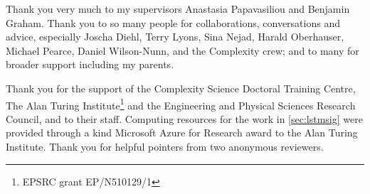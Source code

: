 \documentclass[11pt,a4paper]{report}      %
\begin{document}

\def \alph#1{{\color{bluee}\mathbf{#1}}}

\thesistitlecolourpage           %


\tableofcontents                     %
\listoftables                      %
\listoffigures                     %

\begin{thesisacknowledgments}        %

Thank you very much to my supervisors Anastasia Papavasiliou and Benjamin Graham. Thank you to so many people for collaborations, conversations and advice, especially  Joscha Diehl, 
Terry Lyons, %
Sina Nejad, Harald Oberhauser, Michael Pearce, Daniel Wilson-Nunn, and the Complexity crew; and to many for broader support including my parents.

Thank you for the support of the Complexity Science Doctoral Training Centre, The Alan Turing Institute\footnote{EPSRC grant EP/N510129/1} and the Engineering and Physical Sciences Research Council, and to their staff.
Computing resources for the work in \autoref{sec:lstmsig} were provided through a kind Microsoft Azure for Research award to the Alan Turing Institute.
Thank you for helpful pointers from two anonymous reviewers.
\end{thesisacknowledgments}
\end{document}
